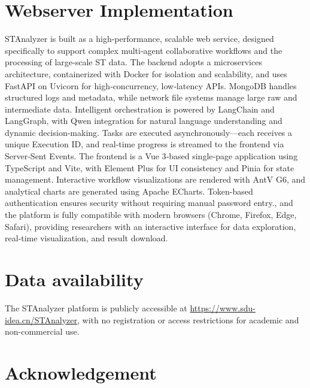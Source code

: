 \documentclass[11pt,a4paper]{article}
\begin{document}
\section{Webserver Implementation}
STAnalyzer is built as a high-performance, scalable web service, designed specifically to support complex multi‑agent collaborative workflows and the processing of large-scale ST data. The backend adopts a microservices architecture, containerized with Docker for isolation and scalability, and uses FastAPI on Uvicorn for high‑concurrency, low‑latency APIs. MongoDB handles structured logs and metadata, while network file systems manage large raw and intermediate data. Intelligent orchestration is powered by LangChain and LangGraph, with Qwen integration for natural language understanding and dynamic decision-making. Tasks are executed asynchronously—each receives a unique Execution ID, and real‑time progress is streamed to the frontend via Server‑Sent Events. The frontend is a Vue 3‑based single‑page application using TypeScript and Vite, with Element Plus for UI consistency and Pinia for state management. Interactive workflow visualizations are rendered with AntV G6, and analytical charts are generated using Apache ECharts. Token-based authentication ensures security without requiring manual password entry., and the platform is fully compatible with modern browsers (Chrome, Firefox, Edge, Safari), providing researchers with an interactive interface for data exploration, real‑time visualization, and result download.

\section{Data availability}
The STAnalyzer platform is publicly accessible at \href{https://www.sdu-idea.cn/STAnalyzer}{https://www.sdu-idea.cn/STAnalyzer}, with no registration or access restrictions for academic and non-commercial use.



\section{Acknowledgement}
\end{document}
